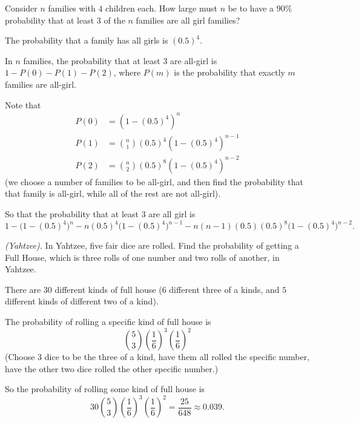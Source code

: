 \begin{problem}[Handout 5, \# 8]
  Consider \(n\) families with \(4\) children each. How large must \(n\) be
  to have a \(90\%\) probability that at least \(3\) of the \(n\) families
  are all girl families?
\end{problem}
\begin{solution}
  The probability that a family has all girls is $(0.5)^4$.

  In $n$ families, the probability that at least $3$ are all-girl is
  $1-P(0)-P(1)-P(2)$, where $P(m)$ is the probability that exactly $m$
  families are all-girl.

  Note that
  \begin{align*}
    P(0) &= (1-(0.5)^4)^n \\
    P(1) &= \binom{n}{1}(0.5)^4(1-(0.5)^4)^{n-1} \\
    P(2) &= \binom{n}{2}(0.5)^8(1-(0.5)^4)^{n-2}
  \end{align*}
  (we choose a number of families to be all-girl, and then find the
  probability that that family is all-girl, while all of the rest are not
  all-girl).

  So that the probability that at least $3$ are all girl is
  \[
    1-\bigl(1-(0.5)^4\bigr)^n - n(0.5)^4\bigl(1-(0.5)^4\bigr)^{n-1} -
    n(n-1)(0.5)(0.5)^8\bigl(1-(0.5)^4\bigr)^{n-2}.
  \]
\end{solution}
\newpage

\begin{problem}[Handout 5, \# 10]
  \emph{(Yahtzee).} In Yahtzee, five fair dice are rolled. Find the
  probability of getting a Full House, which is three rolls of one number
  and two rolls of another, in Yahtzee.
\end{problem}
\begin{solution}
  There are $30$ different kinds of full house ($6$ different three of a
  kinds, and $5$ different kinds of different two of a kind).

  The probability of rolling a specific kind of full house is
  \[
    \binom{5}{3} \left( \frac{1}{6}\right)^3 \left(\frac{1}{6} \right)^2
  \]
  (Choose 3 dice to be the three of a kind, have them all rolled the
  specific number, have the other two dice rolled the other specific
  number.)

  So the probability of rolling some kind of full house is
  \[
    30 \binom{5}{3} \left( \frac{1}{6}\right)^3 \left(\frac{1}{6}
    \right)^2 = \frac{25}{648} \approx 0.039.
  \]
\end{solution}
\newpage


